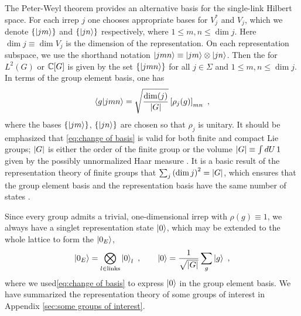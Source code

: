 \medskip

The Peter-Weyl theorem provides an alternative basis for the single-link Hilbert space.
For each irrep $j$ one chooses appropriate bases for $V_j^*$ and $V_j$, which we denote $\{\ket{jm}\}$ and $\{\ket{jn}\}$ respectively, where $1 \leq m,n \leq \dim{j}$.
Here $\dim{j} \equiv \dim{V_j}$ is the dimension of the representation.
On each representation subspace, we use the shorthand notation $\ket{jmn} \equiv \ket{jm} \otimes \ket{jn}$.
Then the  for $L^2(G)$ or $\mathbb{C}[G]$ is given by the set $\{\ket{jmn}\}$ for all $j \in \Sigma$ and $1 \leq m,n \leq \dim{j}$.
In terms of the group element basis, one has \cite{zohar2015latticegauge}
\begin{equation}
    \label{eq:change of basis}
    \expval{g|jmn}= \sqrt{\frac{\mathrm{dim}(j)}{\abs{G}}} \left[\rho_j(g)\right]_{mn} \ ,
\end{equation}
where the bases $\{\ket{jm}\}$, $\{\ket{jn}\}$ are chosen so that $\rho_j$ is unitary.
It should be emphasized that \eqref{eq:change of basis} is valid for both finite and compact Lie groups; $\abs{G}$ is either the order of the finite group or the volume $\abs{G}\equiv\int dU\, 1$ given by the possibly unnormalized Haar measure \cite{milstead2018qyangmills, marianithesis}.
It is a basic result of the representation theory of finite groups that $\sum_j \pqty{\dim{j}}^2 = \abs{G}$, which ensures that the group element basis and the representation basis have the same number of states \cite{serre1967representations}.

Since every group admits a trivial, one-dimensional irrep with $\rho(g)\equiv 1$, we always have a singlet representation state $\ket{0}$, which may be extended to the whole lattice to form the  $\ket{0_E}$,
\begin{equation}
    \label{eq:electric ground state}
    \ket{0_E} = \bigotimes_{l \in \mathrm{links}} \ket{0}_l \ , \quad \quad \ket{0}=\frac{1}{\sqrt{\abs{G}}} \sum_g \ket{g} \ ,
\end{equation}
where we used\eqref{eq:change of basis} to express $\ket{0}$ in the group element basis.
We have summarized the representation theory of some groups of interest in Appendix \ref{sec:some groups of interest}.

\medskip

